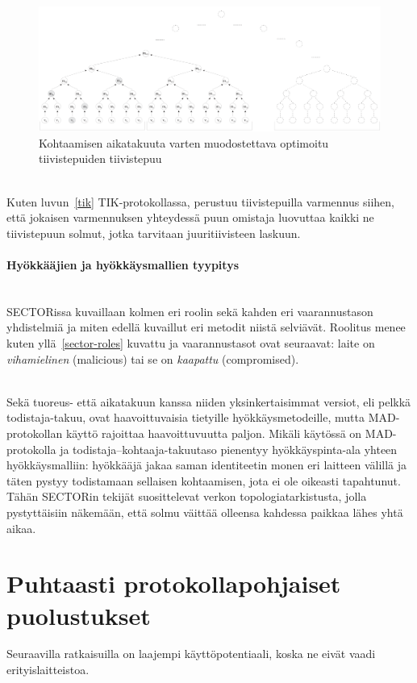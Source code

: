 \documentclass[finnish]{tktltiki2}
\theoremstyle{definition}
\theoremstyle{remark}
\begin{document}
\begin{figure}
  \centering
  \includegraphics[width=\textwidth]{tree-of-trees}
  \caption{Kohtaamisen aikatakuuta varten muodostettava optimoitu tiivistepuiden tiivistepuu \cite{sector}}
  \label{fig:sectortrees}
\end{figure}


\noindent\\
Kuten luvun~\ref{tik} TIK-protokollassa, perustuu tiivistepuilla varmennus siihen, että jokaisen varmennuksen yhteydessä puun omistaja luovuttaa kaikki ne tiivistepuun solmut, jotka tarvitaan juuritiivisteen laskuun.

\paragraph{Hyökkääjien ja hyökkäysmallien tyypitys}
\noindent\\
SECTORissa kuvaillaan kolmen eri roolin sekä kahden eri vaarannustason yhdistelmiä ja miten edellä kuvaillut eri metodit niistä selviävät. Roolitus menee kuten yllä~\ref{sector-roles} kuvattu ja vaarannustasot ovat seuraavat: laite on \emph{vihamielinen} (malicious) tai se on \emph{kaapattu} (compromised).

\noindent\\
Sekä tuoreus- että aikatakuun kanssa niiden yksinkertaisimmat versiot, eli pelkkä todistaja-takuu, ovat haavoittuvaisia tietyille hyökkäysmetodeille, mutta MAD-protokollan käyttö rajoittaa haavoittuvuutta paljon. Mikäli käytössä on MAD-protokolla ja todistaja--kohtaaja-takuutaso pienentyy hyökkäyspinta-ala yhteen hyökkäysmalliin: hyökkääjä jakaa saman identiteetin monen eri laitteen välillä ja täten pystyy todistamaan sellaisen kohtaamisen, jota ei ole oikeasti tapahtunut. Tähän SECTORin tekijät suosittelevat verkon topologiatarkistusta, jolla pystyttäisiin näkemään, että solmu väittää olleensa kahdessa paikkaa lähes yhtä aikaa.


\section{Puhtaasti protokollapohjaiset puolustukset}
Seuraavilla ratkaisuilla on laajempi käyttöpotentiaali, koska ne eivät vaadi erityislaitteistoa.
\end{document}
